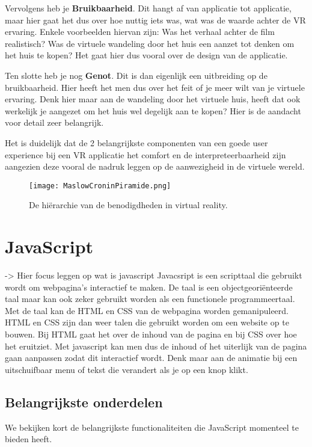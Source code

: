 Vervolgens heb je \textbf{Bruikbaarheid}. Dit hangt af van applicatie tot applicatie, maar hier gaat het dus over hoe nuttig iets was, wat was de waarde achter de VR ervaring. Enkele voorbeelden hiervan zijn: Was het verhaal achter de film realistisch? Was de virtuele wandeling door het huis een aanzet tot denken om het huis te kopen? Het gaat hier dus vooral over de design van de applicatie.

Ten slotte heb je nog \textbf{Genot}. Dit is dan eigenlijk een uitbreiding op de bruikbaarheid. Hier heeft het men dus over het feit of je meer wilt van je virtuele ervaring. Denk hier maar aan de wandeling door het virtuele huis, heeft dat ook werkelijk je aangezet om het huis wel degelijk aan te kopen? Hier is de aandacht voor detail zeer belangrijk.

Het is duidelijk dat de 2 belangrijkste componenten van een goede user experience bij een VR applicatie het comfort en de interpreteerbaarheid zijn aangezien deze vooral de nadruk leggen op de aanwezigheid in de virtuele wereld. 

\begin{figure}
	\centering
	\texttt{[image: MaslowCroninPiramide.png]}
	\caption{De hiërarchie van de benodigdheden in virtual reality.}
	\label{fig:maslowcroninpiramide}
\end{figure}

\autocite{Pappas2016}

\section{JavaScript}
\label{sec:frameworks}
-> Hier focus leggen op wat is javascript
Javacsript is een scripttaal die gebruikt wordt om webpagina's interactief te maken. De taal is een objectgeoriënteerde taal maar kan ook zeker gebruikt worden als een functionele programmeertaal. Met de taal kan de HTML en CSS van de webpagina worden gemanipuleerd. HTML en CSS zijn dan weer talen die gebruikt worden om een website op te bouwen. Bij HTML gaat het over de inhoud van de pagina en bij CSS over hoe het eruitziet. Met javascript kan men dus de inhoud of het uiterlijk van de pagina gaan aanpassen zodat dit interactief wordt. Denk maar aan de animatie bij een uitschuifbaar menu of tekst die verandert als je op een knop klikt.

\subsection{Belangrijkste onderdelen}
\label{subsec:Web VR}
We bekijken kort de belangrijkste functionaliteiten die JavaScript momenteel te bieden heeft.

